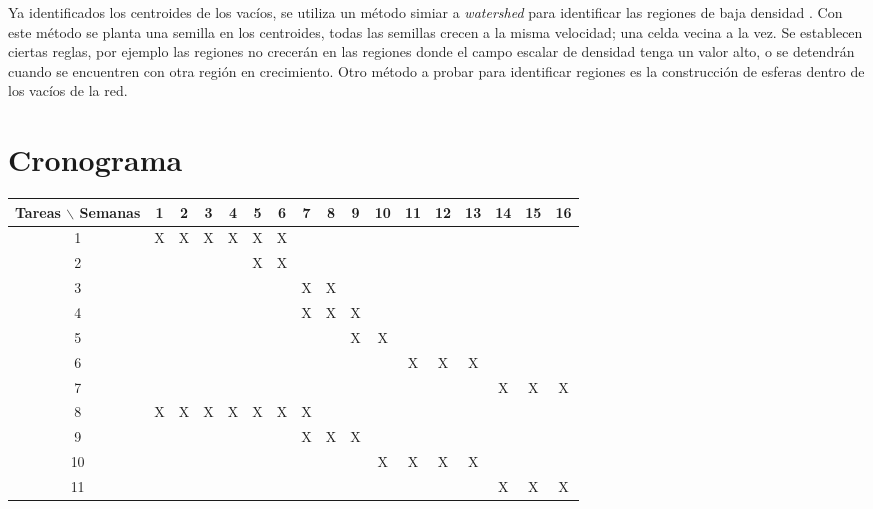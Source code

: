 \documentclass[preprint]{aastex62}
\begin{document}
  Ya identificados los centroides de los vacíos, se utiliza un método simiar a \textit{watershed}
  para identificar las regiones de baja densidad \citep{Sutter2015}. Con este método
  se planta una semilla en los centroides, todas las semillas crecen a la misma velocidad; una
  celda vecina a la vez. Se establecen ciertas reglas, por ejemplo las regiones no crecerán en
  las regiones donde el campo escalar de densidad tenga un valor alto, o se detendrán cuando
  se encuentren con otra región en crecimiento. Otro método a probar para identificar regiones
  es la construcción de esferas dentro de los vacíos de la red. 

  \section{Cronograma}

  \begin{table}[htb]
    \centering
    \begin{tabular}{|c|cccccccccccccccc| }
      \hline
      Tareas $\backslash$ Semanas & 1 & 2 & 3 & 4 & 5 & 6 & 7 & 8 & 9 & 10 & 11 & 12 & 13 & 14 & 15 & 16  \\
      \hline
      1 & X & X & X & X & X & X &   &   &   &   &   &   &   &   &   &   \\
      2 &   &   &   &   & X & X &   &   &   &   &   &   &   &   &   &   \\
      3 &   &   &   &   &   &   & X & X &   &   &   &   &   &   &   &   \\
      4 &   &   &   &   &   &   & X & X & X &   &   &   &   &   &   &   \\
      5 &   &   &   &   &   &   &   &   & X & X &   &   &   &   &   &   \\
      6 &   &   &   &   &   &   &   &   &   &   & X & X & X &   &   &   \\
      7 &   &   &   &   &   &   &   &   &   &   &   &   &   & X & X & X \\
      8 & X & X & X & X & X & X & X &   &   &   &   &   &   &   &   &   \\
      9 &   &   &   &   &   &   & X & X & X &   &   &   &   &   &   &   \\
      10&   &   &   &   &   &   &   &   &   & X & X & X & X &   &   &   \\
      11&   &   &   &   &   &   &   &   &   &   &   &   &   & X & X & X \\
      \hline
    \end{tabular}
  \end{table}
\end{document}

